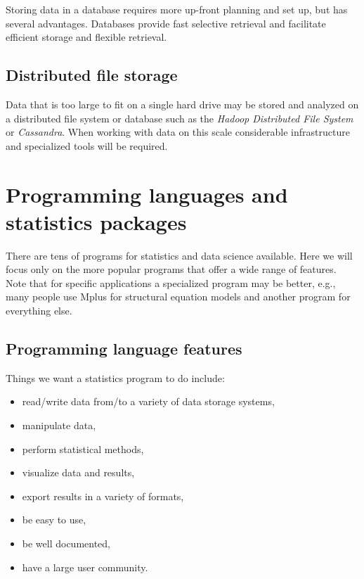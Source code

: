 \documentclass[]{book}
\providecommand{\tightlist}{%
  \setlength{\itemsep}{0pt}\setlength{\parskip}{0pt}}
\begin{document}
Storing data in a database requires more up-front planning and set up,
but has several advantages. Databases provide fast selective retrieval
and facilitate efficient storage and flexible retrieval.

\subsection{Distributed file storage}\label{distributed-file-storage}

Data that is too large to fit on a single hard drive may be stored and
analyzed on a distributed file system or database such as the
\emph{Hadoop Distributed File System} or \emph{Cassandra}. When working
with data on this scale considerable infrastructure and specialized
tools will be required.

\section{Programming languages and statistics
packages}\label{programming-languages-and-statistics-packages}

There are tens of programs for statistics and data science available.
Here we will focus only on the more popular programs that offer a wide
range of features. Note that for specific applications a specialized
program may be better, e.g., many people use Mplus for structural
equation models and another program for everything else.

\subsection{Programming language
features}\label{programming-language-features}

Things we want a statistics program to do include:

\begin{itemize}
\tightlist
\item
  read/write data from/to a variety of data storage systems,
\item
  manipulate data,
\item
  perform statistical methods,
\item
  visualize data and results,
\item
  export results in a variety of formats,
\item
  be easy to use,
\item
  be well documented,
\item
  have a large user community.
\end{itemize}
\end{document}
